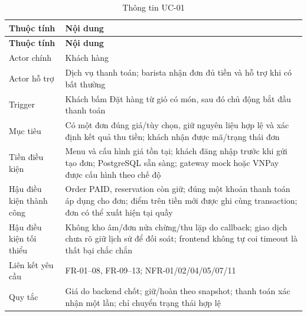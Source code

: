 \begingroup\footnotesize\setlength{\tabcolsep}{3pt}
\begin{longtable}{|>{\raggedright\arraybackslash}p{}|>{\raggedright\arraybackslash}p{}|}
\caption{Thông tin UC-01}\\\hline
\textbf{Thuộc tính} & \textbf{Nội dung} \\ \hline
\endfirsthead
\hline
\textbf{Thuộc tính} & \textbf{Nội dung} \\ \hline
\endhead
Actor chính & Khách hàng \\ \hline
Actor hỗ trợ & Dịch vụ thanh toán; barista nhận đơn đủ tiền và hỗ trợ khi có bất thường \\ \hline
Trigger & Khách bấm Đặt hàng từ giỏ có món, sau đó chủ động bắt đầu thanh toán \\ \hline
Mục tiêu & Có một đơn đúng giá/tùy chọn, giữ nguyên liệu hợp lệ và xác định kết quả thu tiền; khách nhận được mã/trạng thái đơn \\ \hline
Tiền điều kiện & Menu và cấu hình giá tồn tại; khách đăng nhập trước khi gửi tạo đơn; PostgreSQL sẵn sàng; gateway mock hoặc VNPay được cấu hình theo chế độ \\ \hline
Hậu điều kiện thành công & Order PAID, reservation còn giữ; đúng một khoản thanh toán áp dụng cho đơn; điểm trên tiền mới được ghi cùng transaction; đơn có thể xuất hiện tại quầy \\ \hline
Hậu điều kiện tối thiểu & Không kho âm/đơn nửa chừng/thu lặp do callback; giao dịch chưa rõ giữ lịch sử để đối soát; frontend không tự coi timeout là thất bại chắc chắn \\ \hline
Liên kết yêu cầu & FR-01--08, FR-09--13; NFR-01/02/04/05/07/11 \\ \hline
Quy tắc & Giá do backend chốt; giữ/hoàn theo snapshot; thanh toán xác nhận một lần; chỉ chuyển trạng thái hợp lệ \\ \hline
\end{longtable}
\endgroup
\begingroup\footnotesize\setlength{\tabcolsep}{3pt}
